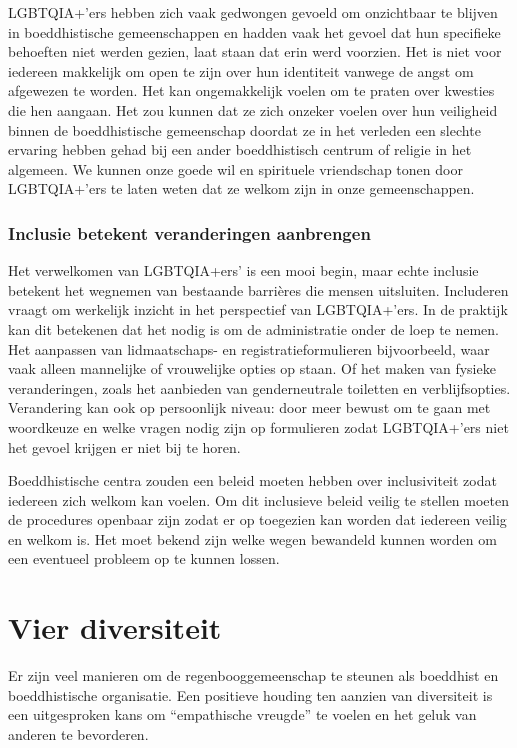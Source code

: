 \documentclass[12pt,openany]{book}
\begin{document}
LGBTQIA+’ers hebben zich vaak gedwongen gevoeld om onzichtbaar te blijven in boeddhistische gemeenschappen en hadden vaak het gevoel dat hun specifieke behoeften niet werden gezien, laat staan dat erin werd voorzien.  Het is niet voor iedereen makkelijk om open te zijn over hun identiteit vanwege de angst om afgewezen te worden. Het kan ongemakkelijk voelen om te praten over kwesties die hen aangaan. Het zou kunnen dat ze zich onzeker voelen over hun veiligheid binnen de boeddhistische gemeenschap doordat ze in het verleden een slechte ervaring hebben gehad bij een ander boeddhistisch centrum of religie in het algemeen. We kunnen onze goede wil en spirituele vriendschap tonen door LGBTQIA+’ers te laten weten dat ze welkom zijn in onze gemeenschappen.

\subsubsection*{Inclusie betekent veranderingen aanbrengen}

Het verwelkomen van LGBTQIA+ers’ is een mooi begin, maar echte inclusie betekent het wegnemen van bestaande barrières die mensen uitsluiten. Includeren vraagt om werkelijk inzicht in het perspectief van LGBTQIA+’ers. In de praktijk kan dit betekenen dat het nodig is om de administratie onder de loep te nemen. Het aanpassen van lidmaatschaps- en registratieformulieren bijvoorbeeld, waar vaak alleen mannelijke of vrouwelijke opties op staan. Of het maken van fysieke veranderingen, zoals het aanbieden van genderneutrale toiletten en verblijfsopties.  Verandering kan ook op persoonlijk niveau: door meer bewust om te gaan met woordkeuze en welke vragen nodig zijn op formulieren zodat LGBTQIA+’ers niet het gevoel krijgen er niet bij te horen.

Boeddhistische centra zouden een beleid moeten hebben over inclusiviteit zodat iedereen zich welkom kan voelen. Om dit inclusieve beleid veilig te stellen moeten de procedures openbaar zijn zodat er op toegezien kan worden dat iedereen veilig en welkom is. Het moet bekend zijn welke wegen bewandeld kunnen worden om een eventueel probleem op te kunnen lossen.

\section*{Vier diversiteit} 

Er zijn veel manieren om de regenbooggemeenschap te steunen als boeddhist en boeddhistische organisatie. Een positieve houding ten aanzien van diversiteit is een uitgesproken kans om “empathische vreugde” te voelen en het geluk van anderen te bevorderen.
\end{document}
